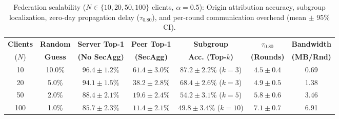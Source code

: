 \begin{table}[t]
\caption{Federation scalability ($N \in \{10, 20, 50, 100\}$ clients, $\alpha=0.5$): Origin attribution accuracy, subgroup localization, zero-day propagation delay ($\tau_{0.80}$), and per-round communication overhead (mean $\pm$ 95\% CI).}
\label{tab:scalability}
\begin{center}
\scriptsize\setlength{\tabcolsep}{2pt}
\begin{tabular}{@{}ccccccc@{}}
\toprule
\textbf{Clients} & \textbf{Random} & \textbf{Server Top-1} & \textbf{Peer Top-1} & \textbf{Subgroup} & $\tau_{0.80}$ & \textbf{Bandwidth} \\
($N$) & \textbf{Guess} & \textbf{(No SecAgg)} & \textbf{(SecAgg)} & \textbf{Acc. (Top-$k$)} & \textbf{(Rounds)} & \textbf{(MB/Rnd)} \\
\midrule
10  & 10.0\% & $96.4 \pm 1.2\%$ & $61.4 \pm 3.0\%$ & $87.2 \pm 2.2\%$ ($k=3$) & $4.5 \pm 0.4$ & 0.69 \\
20  & 5.0\%  & $94.1 \pm 1.5\%$ & $38.2 \pm 2.8\%$ & $68.4 \pm 2.6\%$ ($k=3$) & $4.9 \pm 0.5$ & 1.38 \\
50  & 2.0\%  & $88.4 \pm 2.1\%$ & $19.6 \pm 2.4\%$ & $54.2 \pm 3.1\%$ ($k=5$) & $5.8 \pm 0.6$ & 3.46 \\
100 & 1.0\%  & $85.7 \pm 2.3\%$ & $11.4 \pm 2.1\%$ & $49.8 \pm 3.4\%$ ($k=10$) & $7.1 \pm 0.7$ & 6.91 \\
\bottomrule
\end{tabular}
\end{center}
\end{table}
